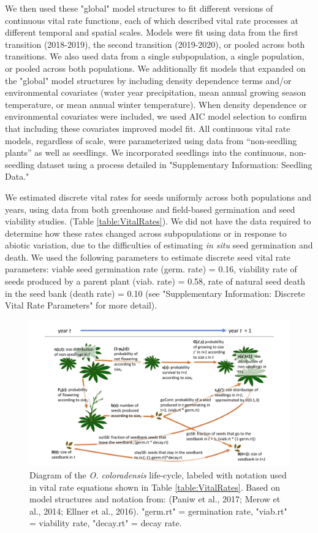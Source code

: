 \documentclass[12pt, letterpaper]{article}
\begin{document}
We then used these "global" model structures to fit different versions of continuous vital rate functions, each of which described vital rate processes at different temporal and spatial scales. Models were fit using data from the first transition (2018-2019), the second transition (2019-2020), or pooled across both transitions. We also used data from a single subpopulation, a single population, or pooled across both populations. We additionally fit models that expanded on the "global" model structures by including density dependence terms and/or environmental covariates (water year precipitation, mean annual growing season temperature, or mean annual winter temperature). When density dependence or environmental covariates were included, we used AIC model selection to confirm that including these covariates improved model fit. All continuous vital rate models, regardless of scale, were parameterized using data from “non-seedling plants” as well as seedlings. We incorporated seedlings into the continuous, non-seedling dataset using a process detailed in "Supplementary Information: Seedling Data." 

We estimated discrete vital rates for seeds uniformly across both populations and years, using data from both greenhouse and field-based germination and seed viability studies. (Table \ref{table:VitalRates}). We did not have the data required to determine how these rates changed across subpopulations or in response to abiotic variation, due to the difficulties of estimating \textit{in situ} seed germination and death. We used the following parameters to estimate discrete seed vital rate parameters: viable seed germination rate (germ. rate) = 0.16, viability rate of seeds produced by a parent plant (viab. rate) = 0.58, rate of natural seed death in the seed bank (death rate) = 0.10 (see "Supplementary Information: Discrete Vital Rate Parameters" for more detail).

\begin{figure}[ht!]
    \centering
    \includegraphics[width=1\textwidth]{figures/COBP_lifecyclediagram_new.pdf}
    \caption{\internallinenumbers
    Diagram of the \textit{O. coloradensis} life-cycle, labeled with notation used in vital rate equations shown in Table \ref{table:VitalRates}. Based on model structures and notation from: (Paniw et al., 2017; Merow et al., 2014; Ellner et al., 2016). "germ.rt" = germination rate, "viab.rt" = viability rate, "decay.rt" = decay rate.}
 \label{fig:lifecycle}
\end{figure}
\end{document}
